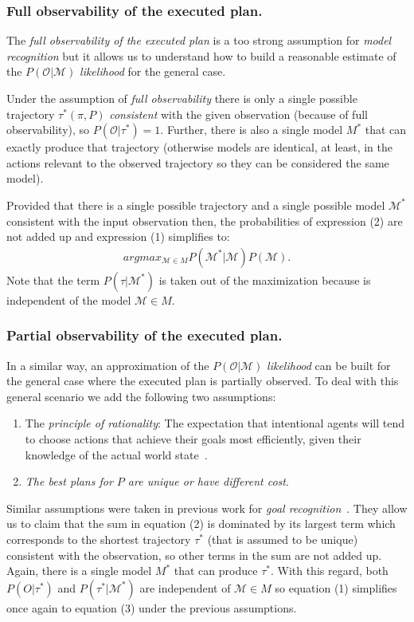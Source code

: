 \documentclass[letterpaper]{article} %
\begin{document}
\subsubsection{Full observability of the executed plan.} The {\em full observability of the executed plan} is a too strong assumption for {\em model recognition} but it allows us to understand how to build a reasonable estimate of the $P(\mathcal{O}|\mathcal{M})$ {\em likelihood} for the general case.

Under the assumption of {\em full observability} there is only a single possible trajectory $\tau^*(\pi,P)$ {\em consistent} with the given observation (because of full observability), so $P(\mathcal{O}|\tau^*)=1$. Further, there is also a single model $M^*$ that can exactly produce that trajectory (otherwise models are identical, at least, in the actions relevant to the observed trajectory so they can be considered the same model).

Provided that there is a single possible trajectory and a single possible model $\mathcal{M}^*$ consistent with the input observation then, the probabilities of expression (2) are not added up and expression (1) simplifies to:
\begin{align}
argmax_{\mathcal{M}\in M} P(\mathcal{M^*}|\mathcal{M}) P(\mathcal{M}).
\end{align}
Note that the term $P(\tau|\mathcal{M^*})$ is taken out of the maximization because is independent of the model $\mathcal{M}\in M$.

\subsubsection{Partial observability of the executed plan.} In a similar way, an approximation of the $P(\mathcal{O}|\mathcal{M})$ {\em likelihood} can be built for the general case where the executed plan is partially observed. To deal with this general scenario we add the following two assumptions:
\begin{enumerate}
\item The {\em principle of rationality}: The expectation that intentional agents will tend to choose actions that achieve their goals most efficiently, given their knowledge of the actual world state~\cite{dennett1983intentional}.
\item {\em The best plans for $P$ are unique or have different cost}.  
\end{enumerate}
Similar assumptions were taken in previous work for {\em goal recognition}~\cite{ramirez2012plan}. They allow us to claim that the sum in equation (2) is dominated by its largest term which corresponds to the shortest trajectory $\tau^*$ (that is assumed to be unique) consistent with the observation, so other terms in the sum are not added up. Again, there is a single model $M^*$ that can produce $\tau^*$. With this regard, both $P(O|\tau^*)$ and $P(\tau^*|\mathcal{M}^*)$ are independent of $\mathcal{M} \in M$ so equation (1) simplifies once again to equation (3) under the previous assumptions.
\end{document}

